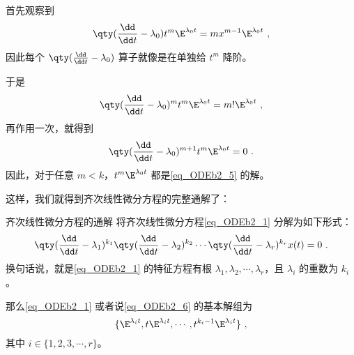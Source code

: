 首先观察到
\begin{equation}
\qty(\frac{\dd}{\dd t}-\lambda_0)t^m\E^{\lambda_0 t}=mx^{m-1}\E^{\lambda_0 t}~,
\end{equation}
因此每个 $\qty(\frac{\dd}{\dd t}-\lambda_0)$ 算子就像是在单独给 $t^m$ 降阶。

于是
\begin{equation}
\qty(\frac{\dd}{\dd t}-\lambda_0)^mt^m\E^{\lambda_0 t}=m!\E^{\lambda_0 t}~,
\end{equation}
再作用一次，就得到
\begin{equation}
\qty(\frac{\dd}{\dd t}-\lambda_0)^{m+1}t^m\E^{\lambda_0 t}=0~.
\end{equation}
因此，对于任意 $m<k$，$t^m\E^{\lambda_0 t}$ 都是\autoref{eq_ODEb2_5} 的解。

这样，我们就得到齐次线性微分方程的完整通解了：

\begin{theorem}{齐次线性微分方程的通解}
将齐次线性微分方程\autoref{eq_ODEb2_1} 分解为如下形式：
\begin{equation}\label{eq_ODEb2_6}
\qty(\frac{\dd}{\dd t}-\lambda_1)^{k_1}\qty(\frac{\dd}{\dd t}-\lambda_2)^{k_2}\cdots\qty(\frac{\dd}{\dd t}-\lambda_r)^{k_r}x(t)=0~.
\end{equation}
换句话说，就是\autoref{eq_ODEb2_1} 的特征方程有根 $\lambda_1, \lambda_2, \cdots, \lambda_r$，且 $\lambda_i$ 的重数为 $k_i$。

那么\autoref{eq_ODEb2_1} 或者说\autoref{eq_ODEb2_6} 的基本解组为
\begin{equation}
\{
    \E^{\lambda_i t}, t\E^{\lambda_i t}, \cdots, t^{k_i-1}\E^{\lambda_i t}
\}~,
\end{equation}
其中 $i\in\{1, 2, 3, \cdots, r\}$。



\end{theorem}









